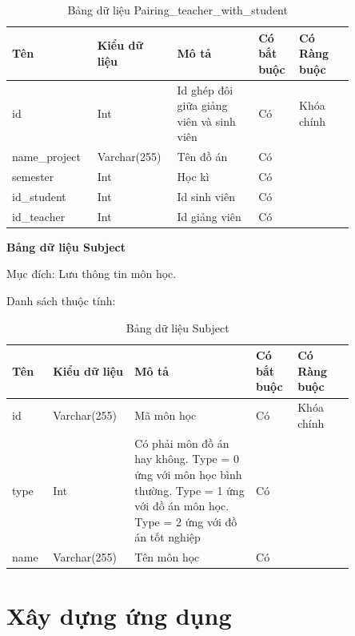 \documentclass[../Main.tex]{subfiles}
\begin{document}
\begin{table}[H]
\centering
\bgroup
\renewcommand{\arraystretch}{1.5}%
\begin{tabular}{|L{0.2\linewidth}|L{0.18\linewidth}|L{0.22\linewidth}|L{0.1\linewidth}|L{0.15\linewidth}|}
\hline
\textbf{Tên} & \textbf{Kiểu dữ liệu} & \textbf{Mô tả} & \textbf{Có bắt buộc} & \textbf{Có Ràng buộc} \\ \hline
id & Int &Id ghép đôi giữa giảng viên và sinh viên & Có & Khóa chính \\ \hline
name\_project & Varchar(255) & Tên đồ án & Có &  \\ \hline
semester & Int & Học kì & Có &  \\ \hline
id\_student & Int & Id sinh viên & Có &  \\ \hline
id\_teacher & Int & Id giảng viên & Có &  \\ \hline
\end{tabular}
\egroup
\caption{Bảng dữ liệu Pairing\_teacher\_with\_student}
\end{table}


\textbf{Bảng dữ liệu Subject}

Mục đích: Lưu thông tin môn học.

Danh sách thuộc tính:
\begin{table}[H]
\centering
\bgroup
\renewcommand{\arraystretch}{1.5}%

\begin{tabular}{|L{0.1\linewidth}|L{0.18\linewidth}|L{0.32\linewidth}|L{0.1\linewidth}|L{0.15\linewidth}|}
\hline
\textbf{Tên} & \textbf{Kiểu dữ liệu} & \textbf{Mô tả} & \textbf{Có bắt  buộc} & \textbf{Có Ràng buộc} \\ \hline
id & Varchar(255) & Mã môn học & Có & Khóa chính \\ \hline
type & Int & Có phải môn đồ án hay không. Type = 0 ứng với môn học bình thường. Type = 1 ứng với đồ án môn học. Type = 2 ứng với đồ án tốt nghiệp & Có &  \\ \hline
name & Varchar(255) & Tên môn học & Có &  \\ \hline
\end{tabular}

\egroup
\caption{Bảng dữ liệu Subject}
\end{table}

\section{Xây dựng ứng dụng}
\end{document}
